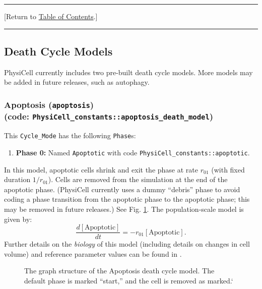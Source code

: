 \documentclass[12pt]{article}
\newcommand{\beq}{\begin{equation}}
\newcommand{\eeq}{\end{equation}}
\renewcommand{\v}{\verb}
\renewcommand{\t}[1]{\left[\mathrm{#1}\right]}
\newcommand{\TOClink}{\begin{center}\hrule\vskip-10pt\phantom{.}\hfill[Return to \hyperlink{TOC}{Table of Contents}.]\hfill\phantom{.}\vskip3pt\hrule\end{center}}
\begin{document}
\TOClink 









\subsection{Death Cycle Models}
\label{sec:Standard_Models:Death}
PhysiCell currently includes two pre-built death cycle models. More models 
may be added in future releases, such as autophagy. 

\subsubsection{Apoptosis (\texttt{apoptosis})\\
(code: \texttt{PhysiCell\_constants::apoptosis\_death\_model})}
\label{sec:Standard_Models:Apoptosis}
This \v|Cycle_Mode| has the following \v|Phase|s: 
\begin{enumerate}
\item 
\textbf{Phase 0:} Named \v|Apoptotic| with code \v|PhysiCell_constants::apoptotic|. 
\end{enumerate}
In this model, apoptotic cells shrink and exit the phase at 
rate $r_{01}$ (with fixed duration $1 / r_{01}$). Cells are removed 
from the simulation at the end of the apoptotic phase. 
(PhysiCell currently uses a dummy ``debris'' phase to avoid coding a 
phase transition from the apoptotic phase to the apoptotic phase; this 
may be removed in future releases.) 
See Fig. \ref{fig:death_model:apoptosis}. The 
population-scale model is given by: 
\beq
\frac{d\t{Apoptotic}}{dt} = -r_{01} \t{Apoptotic}. 
\eeq
Further details on the \emph{biology} of this model (including 
details on changes in cell volume) and reference parameter values can be found in \cite{ref:PhysiCell}. 

\begin{figure}
\begin{mdframed}[style=mystyle]
\caption{The graph structure of the Apoptosis death cycle model. The default phase is marked 
``start,'' and the cell is removed as marked.`}
\label{fig:death_model:apoptosis}
\end{mdframed}
\end{figure}
\end{document}
